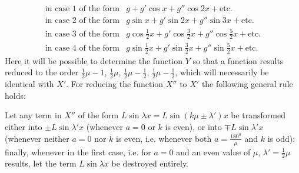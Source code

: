 \[
\begin{array}{ll}
\text{in case 1 of the form}&g+g'\cos x+g''\cos 2x+\text{etc.}\\
\text{in case 2 of the form}&g\sin x+g'\sin 2x+g''\sin 3x+\text{etc.}\\
\text{in case 3 of the form}&g\cos\frac12x+g'\cos\frac32x+g''\cos\frac52x+\text{etc.}\\
\text{in case 4 of the form}&g\sin\frac12x+g'\sin\frac32x+g''\sin\frac52x+\text{etc.}
\end{array}
\]
Here it will be possible to determine the function $Y$ so that a function results reduced to the order $\frac12\mu-1$, $\frac12\mu$, $\frac12\mu-\frac12$, $\frac12\mu-\frac12$, which will necessarily be identical with $X'$. For reducing the function $X''$ to $X'$ the following general rule holds:

Let any term in $X''$ of the form $L\sin\lambda x=L\sin(k\mu\pm\lambda')x$ be transformed either into $\pm L\sin\lambda'x$ (whenever $a=0$ or $k$ is even), or into $\mp L\sin\lambda'x$ (whenever neither $a=0$ nor $k$ is even, i.e. whenever both $a=\frac{180^0}{\mu}$ and $k$ is odd): finally, whenever in the
first case, i.e. for \(a=0\) and an even value of \(\mu\), \(\lambda'=\frac12\mu\) results, let the term \(L\sin\lambda x\) be destroyed entirely.

\endgroup
